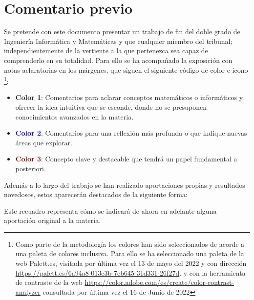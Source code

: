 
\section*{Comentario previo}

Se pretende con este documento presentar un  trabajo de fin del doble grado de Ingeniería Informática y Matemáticas y que cualquier miembro del tribunal; 
independientemente de la vertiente a la que pertenezca sea capaz de comprenderlo en su totalidad.  
Para ello se ha acompañado la exposición con notas aclaratorias en los márgenes, que siguen el siguiente código de color e icono \footnote{Como parte de la metodología los colores han sido seleccionados de acorde a una paleta de colores inclusiva.
Para ello se ha seleccionado una paleta de la web Palett.es, 
visitada por última vez el 13 de mayo del 2022 
y con dirección \url{https://palett.es/6a94a8-013e3b-7eb645-31d331-26f27d}.
y con la herramienta de contraste de la web \url{https://color.adobe.com/es/create/color-contrast-analyzer}
consultada por última vez el 16 de Junio de 2022}: 

\begin{itemize}
    \item  \iconoAclaraciones \textcolor{dark_green}{ \textbf{Color 1}}: Comentarios para 
    aclarar conceptos matemáticos o informáticos y ofrecer la idea intuitiva que 
    se esconde, donde no se presuponen conocimientos avanzados en 
    la materia. 
    \item  \iconoProfundizar \textcolor{blue}{\textbf{Color 2}}: Comentarios para una reflexión más profunda o que indique nuevas áreas que explorar. 
    \item  \iconoClave  \textcolor{darkRed}{ \textbf{Color 3}}: Concepto clave y destacable que tendrá un papel fundamental a posteriori.  
\end{itemize}

Además a lo largo del trabajo se han realizado aportaciones propias y resultados novedosos, estos aparecerán destacados de la siguiente forma: 

\begin{aportacionOriginal}
    Este recuadro representa cómo se indicará de ahora en adelante alguna aportación original a la materia. 
\end{aportacionOriginal}
